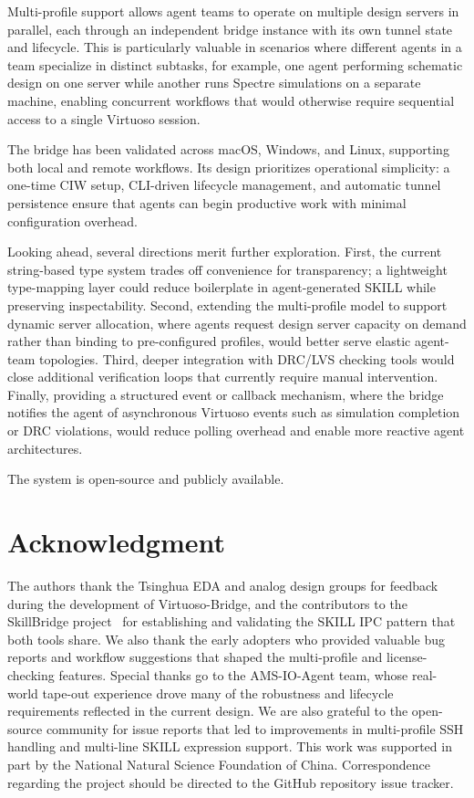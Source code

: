 \documentclass[lettersize,journal]{ieee_template/IEEEtran}
\begin{document}
Multi-profile support allows agent teams to operate on multiple design servers in parallel, each through an independent bridge instance with its own tunnel state and lifecycle. This is particularly valuable in scenarios where different agents in a team specialize in distinct subtasks, for example, one agent performing schematic design on one server while another runs Spectre simulations on a separate machine, enabling concurrent workflows that would otherwise require sequential access to a single Virtuoso session.

The bridge has been validated across macOS, Windows, and Linux, supporting both local and remote workflows. Its design prioritizes operational simplicity: a one-time CIW setup, CLI-driven lifecycle management, and automatic tunnel persistence ensure that agents can begin productive work with minimal configuration overhead.

Looking ahead, several directions merit further exploration. First, the current string-based type system trades off convenience for transparency; a lightweight type-mapping layer could reduce boilerplate in agent-generated SKILL while preserving inspectability. Second, extending the multi-profile model to support dynamic server allocation, where agents request design server capacity on demand rather than binding to pre-configured profiles, would better serve elastic agent-team topologies. Third, deeper integration with DRC/LVS checking tools would close additional verification loops that currently require manual intervention. Finally, providing a structured event or callback mechanism, where the bridge notifies the agent of asynchronous Virtuoso events such as simulation completion or DRC violations, would reduce polling overhead and enable more reactive agent architectures.

The system is open-source and publicly available.

\section*{Acknowledgment}

The authors thank the Tsinghua EDA and analog design groups for feedback during the development of Virtuoso-Bridge, and the contributors to the SkillBridge project~\cite{skillbridge} for establishing and validating the SKILL IPC pattern that both tools share. We also thank the early adopters who provided valuable bug reports and workflow suggestions that shaped the multi-profile and license-checking features. Special thanks go to the AMS-IO-Agent team, whose real-world tape-out experience drove many of the robustness and lifecycle requirements reflected in the current design. We are also grateful to the open-source community for issue reports that led to improvements in multi-profile SSH handling and multi-line SKILL expression support. This work was supported in part by the National Natural Science Foundation of China. Correspondence regarding the project should be directed to the GitHub repository issue tracker.
\end{document}
